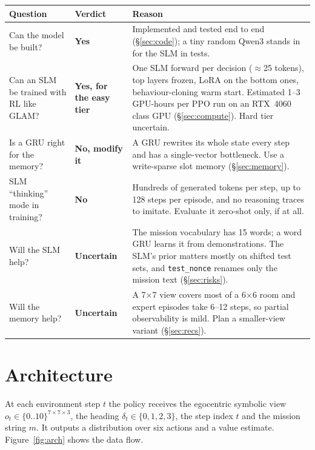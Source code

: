 \documentclass[11pt,a4paper]{article}
\newcommand{\code}[1]{\texttt{\small #1}}
\begin{document}
\begin{center}
\small
\begin{tabularx}{\linewidth}{@{}>{\raggedright\arraybackslash}p{3.6cm}>{\raggedright\arraybackslash}p{2.0cm}X@{}}
\toprule
Question & Verdict & Reason \\
\midrule
Can the model be built? & \textbf{Yes} & Implemented and tested end to end (\S\ref{sec:code}); a tiny random Qwen3 stands in for the SLM in tests. \\
Can an SLM be trained with RL like GLAM? & \textbf{Yes, for the easy tier} & One SLM forward per decision ($\approx$25 tokens), top layers frozen, LoRA on the bottom ones, behaviour-cloning warm start. Estimated 1--3\,GPU-hours per PPO run on an RTX~4060 class GPU (\S\ref{sec:compute}). Hard tier uncertain. \\
Is a GRU right for the memory? & \textbf{No, modify it} & A GRU rewrites its whole state every step and has a single-vector bottleneck. Use a write-sparse slot memory (\S\ref{sec:memory}). \\
SLM ``thinking'' mode in training? & \textbf{No} & Hundreds of generated tokens per step, up to 128 steps per episode, and no reasoning traces to imitate. Evaluate it zero-shot only, if at all. \\
Will the SLM help? & \textbf{Uncertain} & The mission vocabulary has 15 words; a word GRU learns it from demonstrations. The SLM's prior matters mostly on shifted test sets, and \code{test\_nonce} renames only the mission text (\S\ref{sec:risks}). \\
Will the memory help? & \textbf{Uncertain} & A 7$\times$7 view covers most of a 6$\times$6 room and expert episodes take 6--12 steps, so partial observability is mild. Plan a smaller-view variant (\S\ref{sec:recs}). \\
\bottomrule
\end{tabularx}
\end{center}

\section{Architecture}
\label{sec:arch}

At each environment step $t$ the policy receives the egocentric symbolic view $o_t \in \{0..10\}^{7\times7\times3}$, the
heading $\delta_t \in \{0,1,2,3\}$, the step index $t$ and the mission string $m$. It outputs a distribution over six
actions and a value estimate. Figure~\ref{fig:arch} shows the data flow.
\end{document}
